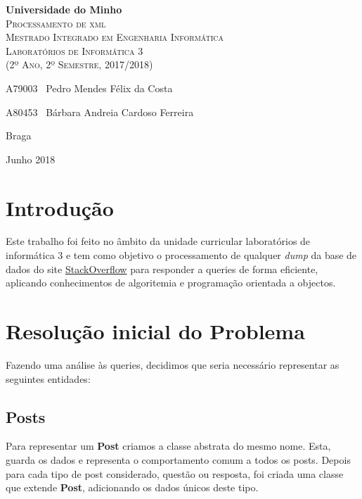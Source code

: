 \documentclass[10pt,a4paper]{report}
\begin{document}
\begin{titlepage}
    \center
    {\huge {\bf Universidade do Minho}}\\[0.4cm]
    \vspace{3.0cm}
    \textsc{\huge{Processamento de xml}}\\[0.5cm]
    \vspace{3.0cm}
    \textsc{\huge{Mestrado Integrado em Engenharia Informática}}\\[0.5cm]
    \vspace{2.0cm}
    \textsc{Laboratórios de Informática 3}\\[0.5cm]
    \textsc{(2º Ano, 2º Semestre, 2017/2018)}\\[0.5cm]
    \vspace{1.5cm}
    \begin{flushleft}
        A79003 \,\,\,Pedro Mendes Félix da Costa
        \vspace{0.2cm}

        A80453 \,\,\,Bárbara Andreia Cardoso Ferreira
    \end{flushleft}
        \vspace{1cm}
    \begin{flushright}
        Braga

        Junho 2018
    \end{flushright}

\end{titlepage}

\tableofcontents
\clearpage

\chapter{Introdução}
    Este trabalho foi feito no âmbito da unidade curricular laboratórios de
    informática 3 e tem como objetivo o processamento de qualquer \textit{dump}
    da base de dados do site \href{www.stackoverflow.com}{StackOverflow} para
    responder a queries de forma eficiente, aplicando conhecimentos de
    algoritemia e programação orientada a objectos.

\chapter{Resolução inicial do Problema}
    Fazendo uma análise às queries, decidimos que seria necessário representar
    as seguintes entidades:

    \section{Posts}
    Para representar um \textbf{Post} criamos a classe abstrata
    do mesmo nome. Esta, guarda os dados e representa o comportamento
    comum a todos os posts. Depois para cada tipo de post considerado, questão
    ou resposta, foi criada uma classe que extende \textbf{Post}, adicionando
    os dados únicos deste tipo.
\end{document}
